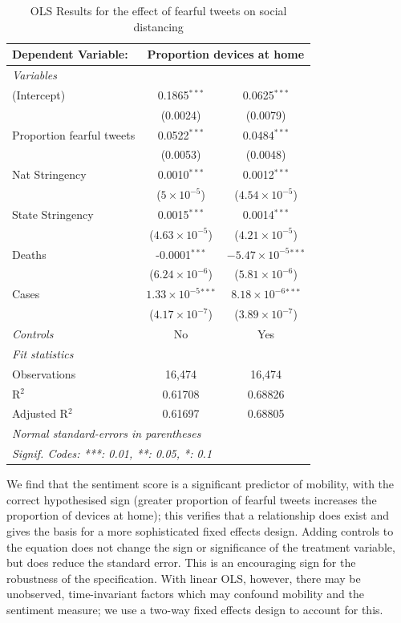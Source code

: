 \documentclass{article}
\begin{document}
\begin{table}[!htb]
  \caption{OLS Results for the effect of fearful tweets on social distancing}
\begin{tabular*}{0.9\textwidth}{l @{\extracolsep{\fill}} cc}
  \midrule\midrule
  Dependent Variable:&\multicolumn{2}{c}{Proportion devices at home}\\
  \midrule \emph{Variables}&   &  \\
  (Intercept)&0.1865$^{***}$ & 0.0625$^{***}$\\
    &(0.0024) & (0.0079)\\
  Proportion fearful tweets &0.0522$^{***}$ & 0.0484$^{***}$\\
    &(0.0053) & (0.0048)\\
  Nat Stringency&0.0010$^{***}$ & 0.0012$^{***}$\\
    &($5\times 10^{-5}$) & ($4.54\times 10^{-5}$)\\
  State Stringency&0.0015$^{***}$ & 0.0014$^{***}$\\
    &($4.63\times 10^{-5}$) & ($4.21\times 10^{-5}$)\\
  Deaths&-0.0001$^{***}$ & $-5.47\times 10^{-5}$$^{***}$\\
    &($6.24\times 10^{-6}$) & ($5.81\times 10^{-6}$)\\
  Cases&$1.33\times 10^{-5}$$^{***}$ & $8.18\times 10^{-6}$$^{***}$\\
    &($4.17\times 10^{-7}$) & ($3.89\times 10^{-7}$)\\
  \midrule \emph{Controls} & No & Yes \\
  \midrule \emph{Fit statistics}&  & \\
  Observations & 16,474&16,474\\
  R$^2$ & 0.61708&0.68826\\
  Adjusted R$^2$ & 0.61697&0.68805\\
  \midrule\midrule\multicolumn{3}{l}{\emph{Normal standard-errors in parentheses}}\\
  \multicolumn{3}{l}{\emph{Signif. Codes: ***: 0.01, **: 0.05, *: 0.1}}\\
  \end{tabular*}
\end{table}
We find that the sentiment score is a significant predictor of mobility, with the correct hypothesised sign (greater proportion of fearful tweets increases the proportion of devices at home); this verifies that a relationship does exist and gives the basis for a more sophisticated fixed effects design. Adding controls to the equation does not change the sign or significance of the treatment variable, but does reduce the standard error. This is an encouraging sign for the robustness of the specification. With linear OLS, however, there may be unobserved, time-invariant factors which may confound mobility and the sentiment measure; we use a two-way fixed effects design to account for this. 
\end{document}
